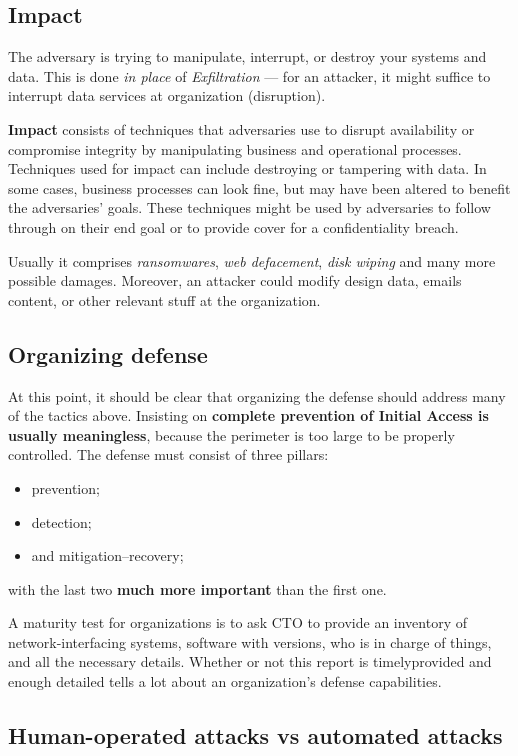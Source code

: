\documentclass[10pt]{extreport}
\begin{document}
\subsection{Impact}

The adversary is trying to manipulate, interrupt, or destroy your systems and
data. This is done \emph{in place} of \emph{Exfiltration} --- for an attacker,
it might suffice to interrupt data services at organization (disruption).

\textbf{Impact} consists of techniques that adversaries use to disrupt
availability or compromise integrity by manipulating business and operational
processes. Techniques used for impact can include destroying or tampering with
data. In some cases, business processes can look fine, but may have been
altered to benefit the adversaries’ goals. These techniques might be used by
adversaries to follow through on their end goal or to provide cover for a
confidentiality breach.

Usually it comprises \emph{ransomwares}, \emph{web defacement}, \emph{disk
wiping} and many more possible damages. Moreover, an attacker could modify
design data, emails content, or other relevant stuff at the organization.

\subsection{Organizing defense}

At this point, it should be clear that organizing the defense should address
many of the tactics above. Insisting on \textbf{complete prevention of Initial
Access is usually meaningless}, because the perimeter is too large to be
properly controlled. The defense must consist of three pillars:
\begin{itemize}
    \item prevention;
    \item detection;
    \item and mitigation\---recovery;
\end{itemize}
with the last two \textbf{much more important} than the first one.

A maturity test for organizations is to ask CTO to provide an inventory of
network\--interfacing systems, software with versions, who is in charge of
things, and all the necessary details. Whether or not this report is
timely\textendash{}provided and enough detailed tells a lot about an
organization's defense capabilities.

\subsection{Human\--operated attacks vs automated attacks}
\end{document}
